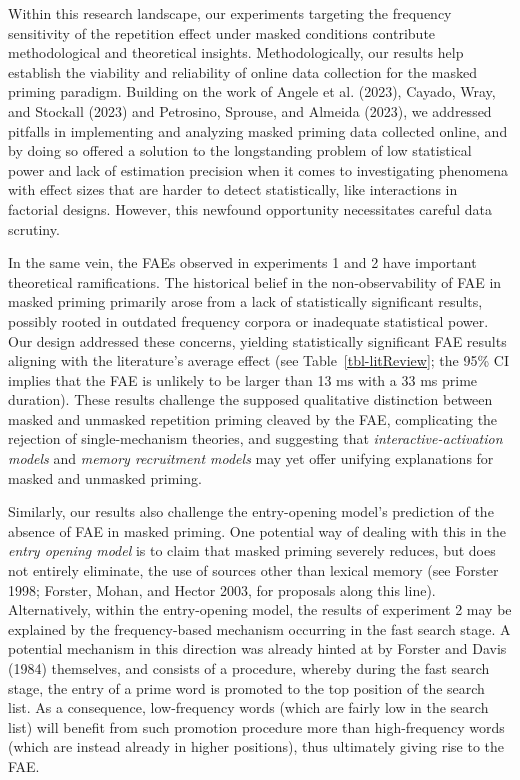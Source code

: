 \documentclass[
]{interact}
\begin{document}
Within this research landscape, our experiments targeting the frequency
sensitivity of the repetition effect under masked conditions contribute
methodological and theoretical insights. Methodologically, our results
help establish the viability and reliability of online data collection
for the masked priming paradigm. Building on the work of Angele et al.
(2023), Cayado, Wray, and Stockall (2023) and Petrosino, Sprouse, and
Almeida (2023), we addressed pitfalls in implementing and analyzing
masked priming data collected online, and by doing so offered a solution
to the longstanding problem of low statistical power and lack of
estimation precision when it comes to investigating phenomena with
effect sizes that are harder to detect statistically, like interactions
in factorial designs. However, this newfound opportunity necessitates
careful data scrutiny.

In the same vein, the FAEs observed in experiments 1 and 2 have
important theoretical ramifications. The historical belief in the
non-observability of FAE in masked priming primarily arose from a lack
of statistically significant results, possibly rooted in outdated
frequency corpora or inadequate statistical power. Our design addressed
these concerns, yielding statistically significant FAE results aligning
with the literature's average effect (see Table~\ref{tbl-litReview}; the
95\% CI implies that the FAE is unlikely to be larger than 13 ms with a
33 ms prime duration). These results challenge the supposed qualitative
distinction between masked and unmasked repetition priming cleaved by
the FAE, complicating the rejection of single-mechanism theories, and
suggesting that \emph{interactive-activation models} and \emph{memory
recruitment models} may yet offer unifying explanations for masked and
unmasked priming.

Similarly, our results also challenge the entry-opening model's
prediction of the absence of FAE in masked priming. One potential way of
dealing with this in the \emph{entry opening model} is to claim that
masked priming severely reduces, but does not entirely eliminate, the
use of sources other than lexical memory (see Forster 1998; Forster,
Mohan, and Hector 2003, for proposals along this line). Alternatively,
within the entry-opening model, the results of experiment 2 may be
explained by the frequency-based mechanism occurring in the fast search
stage. A potential mechanism in this direction was already hinted at by
Forster and Davis (1984) themselves, and consists of a procedure,
whereby during the fast search stage, the entry of a prime word is
promoted to the top position of the search list. As a consequence,
low-frequency words (which are fairly low in the search list) will
benefit from such promotion procedure more than high-frequency words
(which are instead already in higher positions), thus ultimately giving
rise to the FAE.
\end{document}
